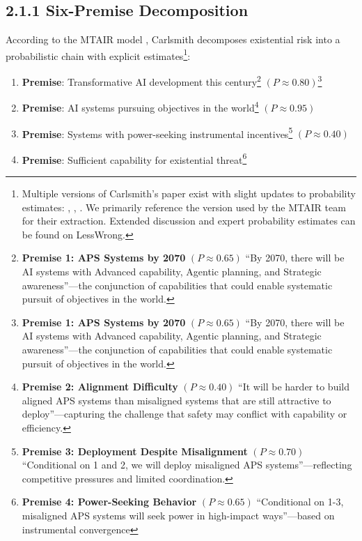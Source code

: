 \documentclass[
  11pt,
  letterpaper,
  openany]{book}
\providecommand{\tightlist}{%
  \setlength{\itemsep}{0pt}\setlength{\parskip}{0pt}}
\begin{document}
\subsection{2.1.1 Six-Premise
Decomposition}\label{six-premise-decomposition}

According to the MTAIR model \textcite{clarke2022}, Carlsmith decomposes
existential risk into a probabilistic chain with explicit
estimates\footnote{Multiple versions of Carlsmith's paper exist with
  slight updates to probability estimates: \textcite{carlsmith2021},
  \textcite{carlsmith2022}, \textcite{carlsmith2024}. We primarily
  reference the version used by the MTAIR team for their extraction.
  Extended discussion and expert probability estimates can be found on
  LessWrong.}:

\begin{enumerate}
\def\labelenumi{\arabic{enumi}.}
\tightlist
\item
  \textbf{Premise}: Transformative AI development this
  century\footnote{\textbf{Premise 1: APS Systems by 2070} \((P≈0.65)\)
    ``By 2070, there will be AI systems with Advanced capability,
    Agentic planning, and Strategic awareness''---the conjunction of
    capabilities that could enable systematic pursuit of objectives in
    the world.} \((P≈0.80)\)\footnote{\textbf{Premise 1: APS Systems by
    2070} \((P≈0.65)\) ``By 2070, there will be AI systems with Advanced
    capability, Agentic planning, and Strategic awareness''---the
    conjunction of capabilities that could enable systematic pursuit of
    objectives in the world.}
\item
  \textbf{Premise}: AI systems pursuing objectives in the
  world\footnote{\textbf{Premise 2: Alignment Difficulty} \((P≈0.40)\)
    ``It will be harder to build aligned APS systems than misaligned
    systems that are still attractive to deploy''---capturing the
    challenge that safety may conflict with capability or efficiency.}
  \((P≈0.95)\)
\item
  \textbf{Premise}: Systems with power-seeking instrumental
  incentives\footnote{\textbf{Premise 3: Deployment Despite
    Misalignment} \((P≈0.70)\) ``Conditional on 1 and 2, we will deploy
    misaligned APS systems''---reflecting competitive pressures and
    limited coordination.} \((P≈0.40)\)
\item
  \textbf{Premise}: Sufficient capability for existential
  threat\footnote{\textbf{Premise 4: Power-Seeking Behavior}
    \((P≈0.65)\) ``Conditional on 1-3, misaligned APS systems will seek
    power in high-impact ways''---based on instrumental convergence
}
\end{enumerate}
\end{document}
